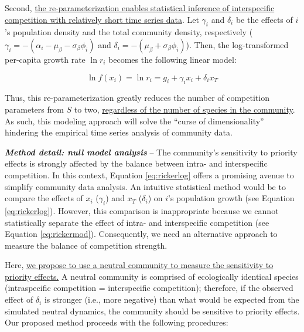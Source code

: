 \documentclass[12pt, class=article, crop=false]{standalone}
\begin{document}
Second, \ul{the re-parameterization enables statistical inference of interspecific competition with relatively short time series data}.
Let $\gamma_i$ and $\delta_i$ be the effects of $i$'s population density and the total community density, respectively ($\gamma_i = -(\alpha_i - \mu_{\beta} - \sigma_{\beta} \phi_i)$ and $\delta_i = -(\mu_{\beta} + \sigma_{\beta} \phi_i)$).
Then, the log-transformed per-capita growth rate $\ln r_i$ becomes the following linear model:

\begin{equation}
\label{eq:rickerlog}
    \ln f(x_i) = \ln r_i = g_i + \gamma_i x_i + \delta_i x_T
\end{equation}

Thus, this re-parameterization greatly reduces the number of competition parameters from $S$ to two, \ul{regardless of the number of species in the community}.
As such, this modeling approach will solve the ``curse of dimensionality'' hindering the empirical time series analysis of community data.

\textbf{\textit{Method detail: null model analysis}} --
The community's sensitivity to priority effects is strongly affected by the balance between intra- and interspecific competition.
In this context, Equation \ref{eq:rickerlog} offers a promising avenue to simplify community data analysis. 
An intuitive statistical method would be to compare the effects of $x_i$ ($\gamma_i$) and $x_T$ ($\delta_i$) on $i$'s population growth (see Equation \ref{eq:rickerlog}).
However, this comparison is inappropriate because we cannot statistically separate the effect of intra- and interspecific competition (see Equation \ref{eq:rickermod}).
Consequently, we need an alternative approach to measure the balance of competition strength.

Here, \ul{we propose to use a neutral community to measure the sensitivity to priority effects.} 
A neutral community is comprised of ecologically identical species (intraspecific competition = interspecific competition); therefore, if the observed effect of $\delta_i$ is stronger (i.e., more negative) than what would be expected from the simulated neutral dynamics, the community should be sensitive to priority effects. Our proposed method proceeds with the following procedures:
\end{document}
